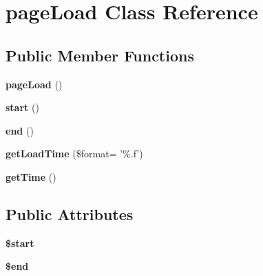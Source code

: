 \hypertarget{classpage_load}{
\section{\-p\-a\-g\-e\-L\-o\-a\-d \-C\-l\-a\-s\-s \-R\-e\-f\-e\-r\-e\-n\-c\-e}
\label{classpage_load}
}
\subsection*{Public Member Functions}
\begin{DoxyCompactItemize}
\item 
\hypertarget{classpage_load_a12743d60a45540a4a7fd7d37d85a3de6}{
{\bfseries \-p\-a\-g\-e\-L\-o\-a\-d} \-(\-)}
\label{classpage_load_a12743d60a45540a4a7fd7d37d85a3de6}

\item 
\hypertarget{classpage_load_abe02ca05b5a9ed3c4feaec4bf9a0a8b9}{
{\bfseries \-s\-t\-a\-r\-t} \-(\-)}
\label{classpage_load_abe02ca05b5a9ed3c4feaec4bf9a0a8b9}

\item 
\hypertarget{classpage_load_a9d5355f531d0bef9958b59775bec5705}{
{\bfseries \-e\-n\-d} \-(\-)}
\label{classpage_load_a9d5355f531d0bef9958b59775bec5705}

\item 
\hypertarget{classpage_load_adaa27d8171d1a02e63157c219b464f57}{
{\bfseries \-g\-e\-t\-L\-o\-a\-d\-T\-i\-m\-e} \-(\$\-f\-o\-r\-m\-a\-t= \-'\%\-.\-f\-'\-)}
\label{classpage_load_adaa27d8171d1a02e63157c219b464f57}

\item 
\hypertarget{classpage_load_a1911d8d78556930fc0562f1e1e1c5908}{
{\bfseries \-g\-e\-t\-T\-i\-m\-e} \-(\-)}
\label{classpage_load_a1911d8d78556930fc0562f1e1e1c5908}

\end{DoxyCompactItemize}
\subsection*{Public Attributes}
\begin{DoxyCompactItemize}
\item 
\hypertarget{classpage_load_ac915bd73f5c626e03ed4597e4602e87e}{
{\bfseries \$\-s\-t\-a\-r\-t}}
\label{classpage_load_ac915bd73f5c626e03ed4597e4602e87e}

\item 
\hypertarget{classpage_load_ad5d2d261b0e4333a841eaf8c63a9555a}{
{\bfseries \$\-e\-n\-d}}
\label{classpage_load_ad5d2d261b0e4333a841eaf8c63a9555a}

\end{DoxyCompactItemize}


